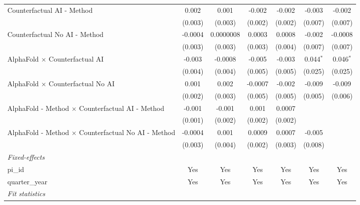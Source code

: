 \begin{tabular}{lcccccc}
   Counterfactual AI - Method                                 & 0.002       & 0.001       & -0.002  & -0.002  & -0.003      & -0.002\\   
                                                              & (0.003)     & (0.003)     & (0.002) & (0.002) & (0.007)     & (0.007)\\   
   Counterfactual No AI - Method                              & -0.0004     & 0.0000008   & 0.0003  & 0.0008  & -0.002      & -0.0008\\   
                                                              & (0.003)     & (0.003)     & (0.003) & (0.004) & (0.007)     & (0.007)\\   
   AlphaFold $\times$ Counterfactual AI                       & -0.003      & -0.0008     & -0.005  & -0.003  & 0.044$^{*}$ & 0.046$^{*}$\\   
                                                              & (0.004)     & (0.004)     & (0.005) & (0.005) & (0.025)     & (0.025)\\   
   AlphaFold $\times$ Counterfactual No AI                    & 0.001       & 0.002       & -0.0007 & -0.002  & -0.009      & -0.009\\   
                                                              & (0.002)     & (0.003)     & (0.005) & (0.005) & (0.005)     & (0.006)\\   
   AlphaFold - Method $\times$ Counterfactual AI - Method     & -0.001      & -0.001      & 0.001   & 0.0007  &             &   \\   
                                                              & (0.001)     & (0.002)     & (0.002) & (0.002) &             &   \\   
   AlphaFold - Method $\times$ Counterfactual No AI - Method  & -0.0004     & 0.001       & 0.0009  & 0.0007  & -0.005      &   \\   
                                                              & (0.003)     & (0.004)     & (0.002) & (0.003) & (0.008)     &   \\   
   \midrule
   \emph{Fixed-effects}\\
   pi\_id                                                     & Yes         & Yes         & Yes     & Yes     & Yes         & Yes\\  
   quarter\_year                                              & Yes         & Yes         & Yes     & Yes     & Yes         & Yes\\  
   \midrule
   \emph{Fit statistics}\\

\end{tabular}
